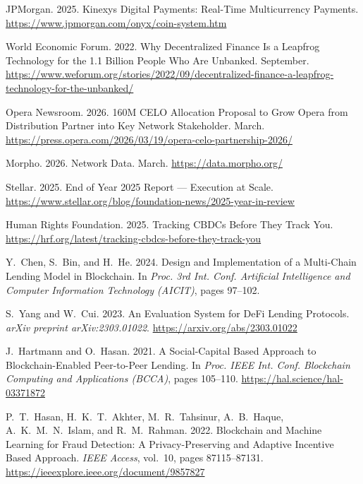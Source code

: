 \documentclass[12pt, a4paper]{report}
\begin{document}
{\begin{enumerate}[label={[\arabic*]}]
\item JPMorgan. 2025. Kinexys Digital Payments: Real-Time Multicurrency Payments. \url{https://www.jpmorgan.com/onyx/coin-system.htm}

\item World Economic Forum. 2022. Why Decentralized Finance Is a Leapfrog Technology for the 1.1 Billion People Who Are Unbanked. September. \url{https://www.weforum.org/stories/2022/09/decentralized-finance-a-leapfrog-technology-for-the-unbanked/}

\item Opera Newsroom. 2026. 160M CELO Allocation Proposal to Grow Opera from Distribution Partner into Key Network Stakeholder. March. \url{https://press.opera.com/2026/03/19/opera-celo-partnership-2026/}

\item Morpho. 2026. Network Data. March. \url{https://data.morpho.org/}

\item Stellar. 2025. End of Year 2025 Report --- Execution at Scale. \url{https://www.stellar.org/blog/foundation-news/2025-year-in-review}

\item Human Rights Foundation. 2025. Tracking CBDCs Before They Track You. \url{https://hrf.org/latest/tracking-cbdcs-before-they-track-you}

\item Y.~Chen, S.~Bin, and H.~He. 2024. Design and Implementation of a Multi-Chain Lending Model in Blockchain. In \emph{Proc. 3rd Int. Conf. Artificial Intelligence and Computer Information Technology (AICIT)}, pages 97--102.

\item S.~Yang and W.~Cui. 2023. An Evaluation System for DeFi Lending Protocols. \emph{arXiv preprint arXiv:2303.01022}. \url{https://arxiv.org/abs/2303.01022}

\item J.~Hartmann and O.~Hasan. 2021. A Social-Capital Based Approach to Blockchain-Enabled Peer-to-Peer Lending. In \emph{Proc. IEEE Int. Conf. Blockchain Computing and Applications (BCCA)}, pages 105--110. \url{https://hal.science/hal-03371872}

\item P.~T.~Hasan, H.~K.~T.~Akhter, M.~R.~Tahsinur, A.~B.~Haque, A.~K.~M.~N.~Islam, and R.~M.~Rahman. 2022. Blockchain and Machine Learning for Fraud Detection: A Privacy-Preserving and Adaptive Incentive Based Approach. \emph{IEEE Access}, vol.~10, pages 87115--87131. \url{https://ieeexplore.ieee.org/document/9857827}


\end{enumerate}}
\end{document}
